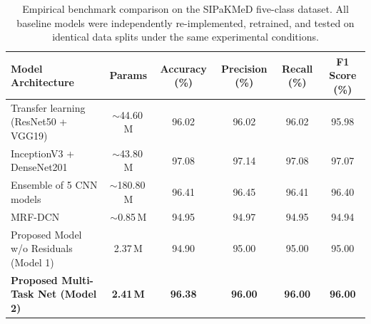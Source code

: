 \documentclass[pdflatex,sn-nature]{sn-jnl}%
\theoremstyle{thmstyleone}%
\theoremstyle{thmstyletwo}%
\theoremstyle{thmstylethree}%
\begin{document}

\begin{table}[htbp]
\centering
\caption{Empirical benchmark comparison on the SIPaKMeD five-class dataset. All baseline models were independently re-implemented, retrained, and tested on identical data splits under the same experimental conditions.}
\label{tab:model_comparison}
\setlength{\tabcolsep}{2.5pt} %
\begin{tabular}{>{\raggedright\arraybackslash}p{4.0cm} ccccc}
\toprule
\textbf{Model Architecture} & \textbf{Params} & \textbf{Accuracy (\%)} & \textbf{Precision (\%)} & \textbf{Recall (\%)} & \textbf{F1 Score (\%)} \\
\midrule
Transfer learning (ResNet50 + VGG19)~\cite{sharma2025diagnosis} & $\sim$44.60\,M & 96.02 & 96.02 & 96.02 & 95.98 \\
InceptionV3 + DenseNet201~\cite{sharma2025enhancing}             & $\sim$43.80\,M & 97.08 & 97.14 & 97.08 & 97.07 \\
Ensemble of 5 CNN models~\cite{Verma2025}                        & $\sim$180.80\,M & 96.41 & 96.45 & 96.41 & 96.40 \\
MRF-DCN~\cite{shaik2025deeplearningenabledsegmentation}         & $\sim$0.85\,M  & 94.95 & 94.97 & 94.95 & 94.94 \\
Proposed Model w/o Residuals (Model 1)                          & 2.37\,M        & 94.90 & 95.00 & 95.00 & 95.00 \\
\textbf{Proposed Multi-Task Net (Model 2)}                      & \textbf{2.41\,M} & \textbf{96.38} & \textbf{96.00} & \textbf{96.00} & \textbf{96.00} \\
\bottomrule
\end{tabular}
\end{table}
\end{document}
